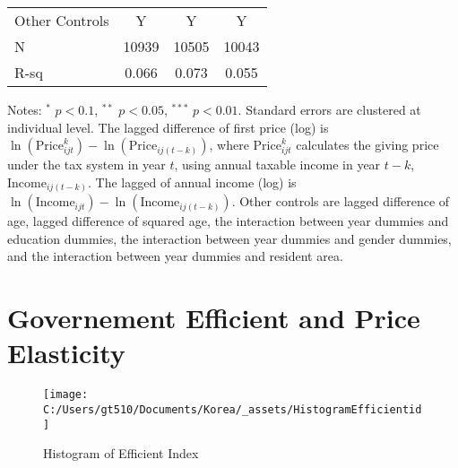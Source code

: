 \documentclass[ review  , 3p ]{elsarticle}
\begin{document}
\begin{table}
\begin{threeparttable}
\begin{tabular}[t]{lccc}
  \hspace{1em}Other Controls & Y & Y & Y\\
  \hspace{1em}N & 10939 & 10505 & 10043\\
  \hspace{1em}R-sq & 0.066 & 0.073 & 0.055\\
  \bottomrule
  \end{tabular}
  \begin{tablenotes}
  \item Notes: $^{*}$ $p < 0.1$, $^{**}$ $p < 0.05$, $^{***}$ $p < 0.01$. Standard errors are clustered at individual level. The lagged difference of first price (log) is $\ln(\text{Price}^k_{ijt}) - \ln(\text{Price}_{ij(t-k)})$, where $\text{Price}^k_{ijt}$ calculates the giving price under the tax system in year $t$, using annual taxable income in year $t-k$, $\text{Income}_{ij(t-k)}$. The lagged of annual income (log) is $\ln(\text{Income}_{ijt}) - \ln(\text{Income}_{ij(t-k)})$. Other controls are lagged difference of age, lagged difference of squared age, the interaction between year dummies and education dummies, the interaction between year dummies and gender dummies, and the interaction between year dummies and resident area.
  \end{tablenotes}
  \end{threeparttable}
  \end{table}
  
  \hypertarget{governement-efficient-and-price-elasticity}{%
  \section{Governement Efficient and Price Elasticity}\label{governement-efficient-and-price-elasticity}}
  
  \begin{figure}
  
  {\centering \texttt{[image: C:/Users/gt510/Documents/Korea/\_assets/HistogramEfficientid]} 
  
  }
  
  \caption{Histogram of Efficient Index}\label{fig:unnamed-chunk-5}
  \end{figure}
  
\end{document}
